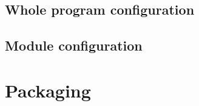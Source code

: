 \documentclass[draftmode,draftwater]{memarticle}
\begin{document}


\subsection{Whole program configuration}


\subsection{Module configuration}


\section{Packaging}



\end{document}
